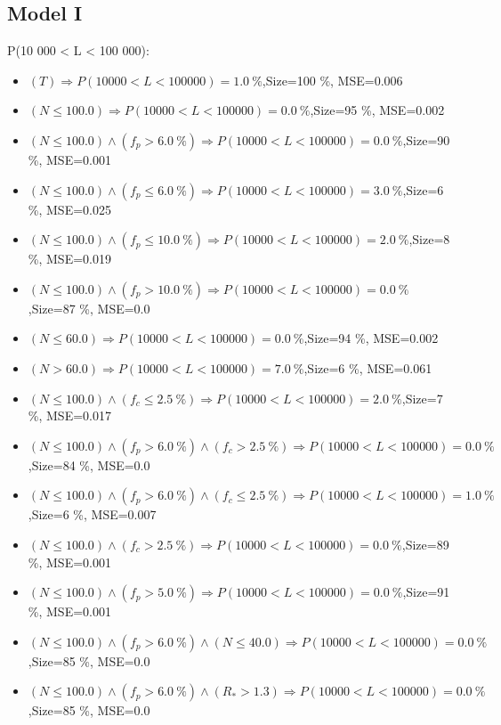 \documentclass[numbered]{CSL}
\begin{document}
\subsection{Model I}
P(10 000 < L < 100 000):
\begin{itemize}
\item $(T) \Rightarrow P(10 000 < L < 100 000) = 1.0~\%$,\hfill Size=100 \%, MSE=0.006
\item $(N \leq 100.0) \Rightarrow P(10 000 < L < 100 000) = 0.0~\%$,\hfill Size=95 \%, MSE=0.002
\item $(N \leq 100.0) \land (f_p > 6.0~\%) \Rightarrow P(10 000 < L < 100 000) = 0.0~\%$,\hfill Size=90 \%, MSE=0.001
\item $(N \leq 100.0) \land (f_p \leq 6.0~\%) \Rightarrow P(10 000 < L < 100 000) = 3.0~\%$,\hfill Size=6 \%, MSE=0.025
\item $(N \leq 100.0) \land (f_p \leq 10.0~\%) \Rightarrow P(10 000 < L < 100 000) = 2.0~\%$,\hfill Size=8 \%, MSE=0.019
\item $(N \leq 100.0) \land (f_p > 10.0~\%) \Rightarrow P(10 000 < L < 100 000) = 0.0~\%$,\hfill Size=87 \%, MSE=0.0
\item $(N \leq 60.0) \Rightarrow P(10 000 < L < 100 000) = 0.0~\%$,\hfill Size=94 \%, MSE=0.002
\item $(N > 60.0) \Rightarrow P(10 000 < L < 100 000) = 7.0~\%$,\hfill Size=6 \%, MSE=0.061
\item $(N \leq 100.0) \land (f_c \leq 2.5~\%) \Rightarrow P(10 000 < L < 100 000) = 2.0~\%$,\hfill Size=7 \%, MSE=0.017
\item $(N \leq 100.0) \land (f_p > 6.0~\%) \land (f_c > 2.5~\%) \Rightarrow P(10 000 < L < 100 000) = 0.0~\%$,\hfill Size=84 \%, MSE=0.0
\item $(N \leq 100.0) \land (f_p > 6.0~\%) \land (f_c \leq 2.5~\%) \Rightarrow P(10 000 < L < 100 000) = 1.0~\%$,\hfill Size=6 \%, MSE=0.007
\item $(N \leq 100.0) \land (f_c > 2.5~\%) \Rightarrow P(10 000 < L < 100 000) = 0.0~\%$,\hfill Size=89 \%, MSE=0.001
\item $(N \leq 100.0) \land (f_p > 5.0~\%) \Rightarrow P(10 000 < L < 100 000) = 0.0~\%$,\hfill Size=91 \%, MSE=0.001
\item $(N \leq 100.0) \land (f_p > 6.0~\%) \land (N \leq 40.0) \Rightarrow P(10 000 < L < 100 000) = 0.0~\%$,\hfill Size=85 \%, MSE=0.0
\item $(N \leq 100.0) \land (f_p > 6.0~\%) \land (R_* > 1.3) \Rightarrow P(10 000 < L < 100 000) = 0.0~\%$,\hfill Size=85 \%, MSE=0.0

\end{itemize}
\end{document}
